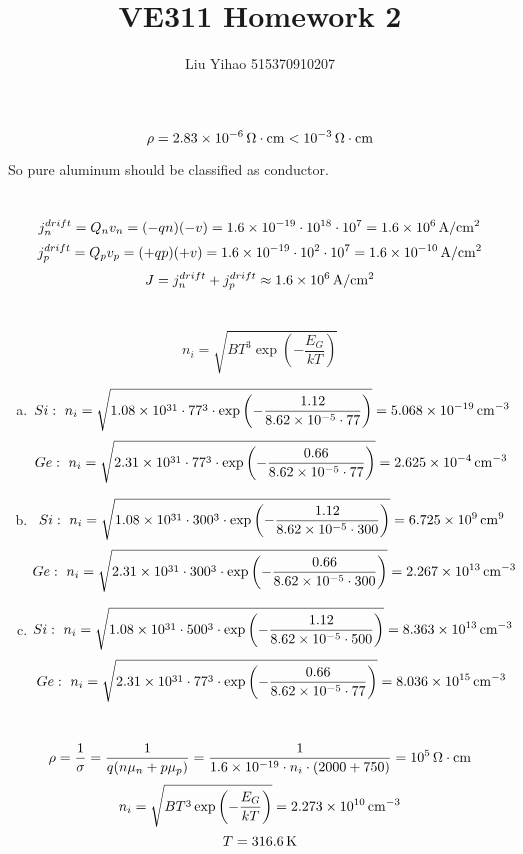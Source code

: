 \documentclass{article}
\title{VE311 Homework 2}
\author{Liu Yihao 515370910207}
\date{}
\newcommand{\Omegacm}{{\rm\,\Omega\cdot cm}}
\newcommand{\unit}[1]{{\rm\,#1}}
\begin{document}
\maketitle

\section{}
$$\rho=2.83\times10^{-6}\Omegacm<10^{-3}\Omegacm$$

So pure aluminum should be classified as conductor.

\section{}
$$j_n^{drift}=Q_nv_n=(-qn)(-v)=1.6\times10^{-19}\cdot10^{18}\cdot10^7=1.6\times10^6\unit{A/cm^2}$$
$$j_p^{drift}=Q_pv_p=(+qp)(+v)=1.6\times10^{-19}\cdot10^{2}\cdot10^7=1.6\times10^{-10}\unit{A/cm^2}$$
$$J=j_n^{drift}+j_p^{drift}\approx1.6\times10^6\unit{A/cm^2}$$

\section{}
$$n_i=\sqrt{BT^3\exp\left(-\frac{E_G}{kT}\right)}$$

\begin{enumerate}[(a)]
\item
$$Si:\ n_i=\sqrt{1.08\times10^{31}\cdot77^3\cdot\exp\left(-\frac{1.12}{8.62\times10^{-5}\cdot77}\right)}=5.068\times10^{-19}\unit{cm^{-3}}$$
$$Ge:\ n_i=\sqrt{2.31\times10^{31}\cdot77^3\cdot\exp\left(-\frac{0.66}{8.62\times10^{-5}\cdot77}\right)}=2.625\times10^{-4}\unit{cm^{-3}}$$
\item
$$Si:\ n_i=\sqrt{1.08\times10^{31}\cdot300^3\cdot\exp\left(-\frac{1.12}{8.62\times10^{-5}\cdot300}\right)}=6.725\times10^{9}\unit{cm^{9}}$$
$$Ge:\ n_i=\sqrt{2.31\times10^{31}\cdot300^3\cdot\exp\left(-\frac{0.66}{8.62\times10^{-5}\cdot300}\right)}=2.267\times10^{13}\unit{cm^{-3}}$$
\item
$$Si:\ n_i=\sqrt{1.08\times10^{31}\cdot500^3\cdot\exp\left(-\frac{1.12}{8.62\times10^{-5}\cdot500}\right)}=8.363\times10^{13}\unit{cm^{-3}}$$
$$Ge:\ n_i=\sqrt{2.31\times10^{31}\cdot77^3\cdot\exp\left(-\frac{0.66}{8.62\times10^{-5}\cdot77}\right)}=8.036\times10^{15}\unit{cm^{-3}}$$
\end{enumerate} 

\section{}
$$\rho=\frac{1}{\sigma}=\frac{1}{q(n\mu_n+p\mu_p)}=\frac{1}{1.6\times10^{-19}\cdot n_i\cdot(2000+750)}=10^5\Omegacm$$
$$n_i=\sqrt{BT^3\exp\left(-\frac{E_G}{kT}\right)}=2.273\times10^{10}\unit{cm^{-3}}$$
$$T=316.6\unit{K}$$
\end{document}
